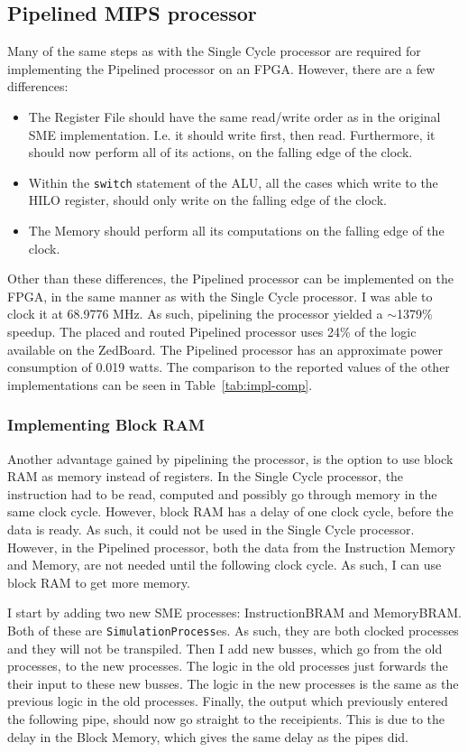 \subsection{Pipelined MIPS processor}
Many of the same steps as with the Single Cycle processor are required for
implementing the Pipelined processor on an FPGA. However, there are a few
differences:
\begin{itemize}
    \item The Register File should have the same read/write order as in
        the original SME implementation. I.e. it should write first, then read.
        Furthermore, it should now perform all of its actions, on the falling
        edge of the clock.

    \item Within the \texttt{switch} statement of the ALU, all the cases which
        write to the HILO register, should only write on the falling edge of
        the clock.

    \item The Memory should perform all its computations on the falling edge of
        the clock.
\end{itemize}
Other than these differences, the Pipelined processor can be implemented on the
FPGA, in the same manner as with the Single Cycle processor. I was able to clock
it at 68.9776 MHz. As such, pipelining the processor yielded a $\sim$1379\%
speedup. The placed and routed Pipelined processor uses 24\% of the logic
available on the ZedBoard. The Pipelined processor has an approximate power
consumption of 0.019 watts. The comparison to the reported values of the other
implementations can be seen in Table~\ref{tab:impl-comp}.

\subsubsection*{Implementing Block RAM}
Another advantage gained by pipelining the processor, is the option to use block
RAM as memory instead of registers. In the Single Cycle processor,
the instruction had to be read, computed and possibly go through memory in the
same clock cycle. However, block RAM has a delay of one clock cycle, before the
data is ready. As such, it could not be used in the Single Cycle processor.
However, in the Pipelined processor, both the data from the Instruction Memory
and Memory, are not needed until the following clock cycle. As such, I can use
block RAM to get more memory.

I start by adding two new SME processes: InstructionBRAM and MemoryBRAM. Both
of these are \texttt{SimulationProcess}es. As such, they are both clocked
processes and they will not be transpiled. Then I add new busses, which go from
the old processes, to the new processes. The logic in the old processes
just forwards the their input to these new busses. The logic in the new
processes is the same as the previous logic in the old processes. Finally, the
output which previously entered the following pipe, should now go straight to
the receipients. This is due to the delay in the Block Memory, which gives the
same delay as the pipes did.

